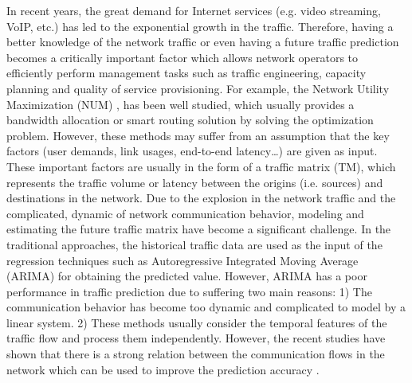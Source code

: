 In recent years, the great demand for Internet services (e.g. video streaming, VoIP, etc.) has led to the exponential growth in the traffic. Therefore, having a better knowledge of the network traffic or even having a future traffic prediction becomes a critically important factor which allows network operators to efficiently perform management tasks such as traffic engineering, capacity planning and quality of service provisioning. For example, the Network Utility Maximization (NUM) \cite{ref:xu2018experience}, \cite{ref:low1999optimization} has been well studied, which usually provides a bandwidth allocation or smart routing solution by solving the optimization problem. However, these methods may suffer from an assumption that the key factors (user demands, link usages, end-to-end latency…) are given as input. These important factors are usually in the form of a traffic matrix (TM), which represents the traffic volume or latency between the origins (i.e. sources) and destinations in the network. Due to the explosion in the network traffic and the complicated, dynamic of network communication behavior, modeling and estimating the future traffic matrix have become a significant challenge. In the traditional approaches, the historical traffic data are used as the input of the regression techniques such as Autoregressive Integrated Moving Average (ARIMA) \cite{ref:box2015time} for obtaining the predicted value. However, ARIMA has a poor performance in traffic prediction due to suffering two main reasons: 1) The communication behavior has become too dynamic and complicated to model by a linear system. 2) These methods usually consider the temporal features of the traffic flow and process them independently. However, the recent studies have shown that there is a strong relation between the communication flows in the network which can be used to improve the prediction accuracy \cite{ref:wang2017spatiotemporal}.

